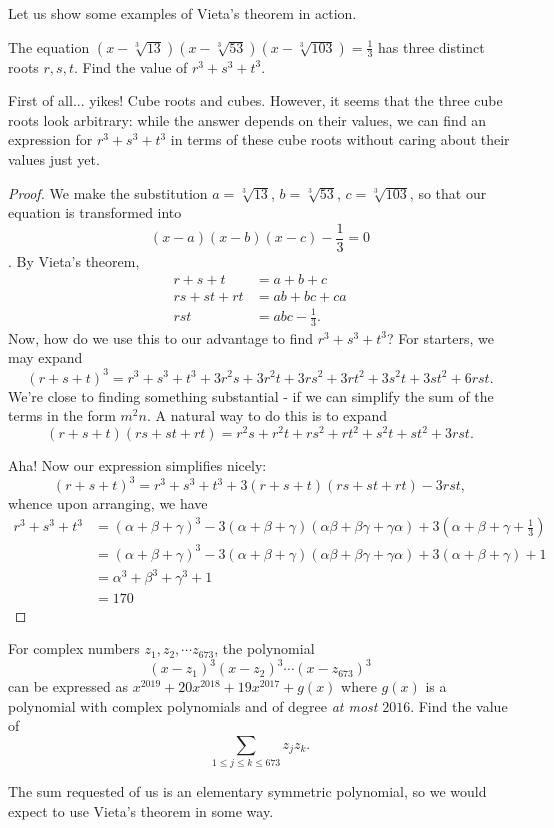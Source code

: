 \documentclass[../main.tex]{subfiles}
\begin{document}
Let us show some examples of Vieta's theorem in action. 
\begin{example}
    The equation $(x-\sqrt[3]{13})(x-\sqrt[3]{53})(x-\sqrt[3]{103})=\frac{1}{3}$ has three distinct roots $r,s,t$. Find the value of $r^3+s^3+t^3$.
\end{example}

First of all... yikes! Cube roots and cubes. However, it seems that the three cube roots look arbitrary: while the answer depends on their values, we can find an expression for $r^3+s^3+t^3$ in terms of these cube roots without caring about their values just yet. 
\begin{proof}
    We make the substitution $a=\sqrt[3]{13}$, $b=\sqrt[3]{53}$, $c=\sqrt[3]{103}$, so that our equation is transformed into $$(x-a)(x-b)(x-c)-\frac{1}{3}=0$$. By Vieta's theorem, 
\begin{align*}
    r+s+t&=a+b+c \\
    rs+st+rt&=ab+bc+ca \\
    rst&=abc-\frac{1}{3}.
\end{align*}
Now, how do we use this to our advantage to find $r^3+s^3+t^3$? For starters, we may expand
$$(r+s+t)^3=r^3+s^3+t^3+3r^2s+3r^2t+3rs^2+3rt^2+3s^2t+3st^2+6rst.$$
We're close to finding something substantial - if we can simplify the sum of the terms in the form $m^2n$. A natural way to do this is to expand
$$(r+s+t)(rs+st+rt)=r^2s+r^2t+rs^2+rt^2+s^2t+st^2+3rst.$$

Aha! Now our expression simplifies nicely:
$$(r+s+t)^3=r^3+s^3+t^3+3(r+s+t)(rs+st+rt)-3rst,$$
whence upon arranging, we have
\begin{align*}
    r^3+s^3+t^3
    &=(\alpha+\beta+\gamma)^3-3(\alpha+\beta+\gamma)(\alpha\beta+\beta\gamma+\gamma\alpha)+3(\alpha+\beta+\gamma+\frac{1}{3})\\
    &=(\alpha+\beta+\gamma)^3-3(\alpha+\beta+\gamma)(\alpha\beta+\beta\gamma+\gamma\alpha)+3(\alpha+\beta+\gamma)+1 \\
    &=\alpha^3+\beta^3+\gamma^3+1 \\
    &=\boxed{170}
\end{align*}
\end{proof}

\begin{example}[2019 AIME I P10]
For complex numbers $z_1, z_2,\cdots z_{673}$, the polynomial
$$(x-z_1)^3(x-z_2)^3\cdots(x-z_673)^3$$
can be expressed as $x^{2019}+20x^{2018}+19x^{2017}+g(x)$ where $g(x)$ is a polynomial with complex polynomials and of degree \textit{at most} $2016$. Find the value of 
$$\sum_{1\leq j\leq k\leq 673}z_jz_k.$$
\end{example}
The sum requested of us is an elementary symmetric polynomial, so we would expect to use Vieta's theorem in some way.
\end{document}
